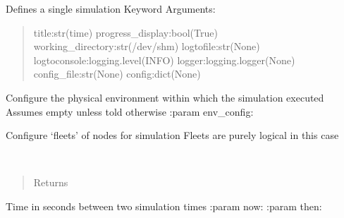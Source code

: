 \documentclass[letterpaper,10pt,english]{sphinxmanual}
\begin{document}
\begin{fulllineitems}
\label{index:aietes.Simulation}
Defines a single simulation
Keyword Arguments:
\begin{quote}

title:str(time)
progress\_display:bool(True)
working\_directory:str(/dev/shm)
logtofile:str(None)
logtoconsole:logging.level(INFO)
logger:logging.logger(None)
config\_file:str(None)
config:dict(None)
\end{quote}

\begin{fulllineitems}
\label{index:aietes.Simulation.configure_environment}
Configure the physical environment within which the simulation executed
Assumes empty unless told otherwise
:param env\_config:

\end{fulllineitems}


\begin{fulllineitems}
\label{index:aietes.Simulation.configure_nodes}
Configure `fleets' of nodes for simulation
Fleets are purely logical in this case

\end{fulllineitems}


\begin{fulllineitems}
\label{index:aietes.Simulation.current_state}~\begin{quote}\begin{description}
\item[{Returns}] \leavevmode


\end{description}\end{quote}

\end{fulllineitems}


\begin{fulllineitems}
\label{index:aietes.Simulation.delta_t}
Time in seconds between two simulation times
:param now:
:param then:


\end{fulllineitems}
\end{fulllineitems}
\end{document}
